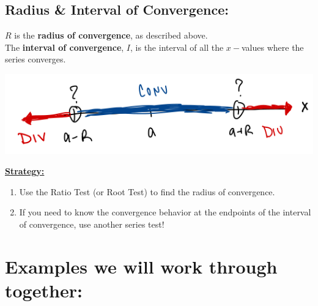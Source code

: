 \documentclass[10pt]{article}
\begin{document}
 
 \vspace*{.1in}
 
\subsection*{Radius \& Interval of Convergence:}


 \(R\) is the \textbf{radius of convergence}, as described above.\\
 The \textbf{interval of convergence}, \(I\), is the interval of all the \(x-\)values where the series converges.
 
 \includegraphics[width=.75\textwidth]{Ch8s5-Power-Series-Interval.png}
 
 
 \underline{\textbf{Strategy:}}\\
 \begin{enumerate}
 \item Use the Ratio Test (or Root Test) to find the radius of convergence.
 \item If you need to know the convergence behavior at the endpoints of the interval of convergence, use another series test!
 \end{enumerate}

\vspace*{.2in}




\section*{Examples we will work through together:}
\end{document}
